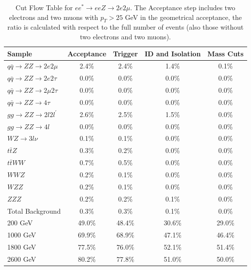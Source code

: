 \begin{table}[h]
\begin{center}
\begin{tabular}{|l|c|c|c|c|}
\hline
Sample & Acceptance & Trigger & ID and Isolation & Mass Cuts \\
\hline
\hline
$q\bar{q} \rightarrow ZZ \rightarrow 2e2\mu$ & 2.4\% & 2.4\% & 1.4\% & 0.1\% \\
$q\bar{q} \rightarrow ZZ \rightarrow 2e2\tau$ & 0.0\% & 0.0\% & 0.0\% & 0.0\% \\
$q\bar{q} \rightarrow ZZ \rightarrow 2\mu2\tau$ & 0.0\% & 0.0\% & 0.0\% & 0.0\% \\
$q\bar{q} \rightarrow ZZ \rightarrow 4\tau$ & 0.0\% & 0.0\% & 0.0\% & 0.0\% \\
$gg \rightarrow ZZ \rightarrow 2l2l^{\prime}$ & 2.6\% & 2.5\% & 1.5\% & 0.0\% \\
$gg \rightarrow ZZ \rightarrow 4l$ & 0.0\% & 0.0\% & 0.0\% & 0.0\% \\
$WZ \rightarrow 3l\nu$ & 0.1\% & 0.1\% & 0.0\% & 0.0\% \\
$t\bar{t}Z$ & 0.3\% & 0.2\% & 0.0\% & 0.0\% \\
$t\bar{t}WW$ & 0.7\% & 0.5\% & 0.0\% & 0.0\% \\
$WWZ$   & 0.2\% & 0.1\% & 0.0\% & 0.0\% \\
$WZZ$   & 0.2\% & 0.1\% & 0.0\% & 0.0\% \\
$ZZZ$   & 0.2\% & 0.2\% & 0.1\% & 0.0\% \\
\hline
\hline
Total Background & 0.3\% & 0.3\% & 0.1\% & 0.0\% \\
\hline
\hline
200 GeV & 49.0\% & 48.4\% & 30.6\% & 29.0\% \\
1000 GeV & 69.9\% & 68.9\% & 47.1\% & 46.4\% \\
1800 GeV & 77.5\% & 76.0\% & 52.1\% & 51.4\% \\
2600 GeV & 80.2\% & 77.8\% & 51.0\% & 50.0\% \\
\hline
\end{tabular}
\end{center}
\caption{\label{tab:CutFlow_2e2mu}Cut Flow Table for $ee^{*} \rightarrow ee Z \rightarrow 2e2\mu$. The Acceptance step includes two electrons and two muons with $p_{T} > 25$ GeV in the geometrical acceptance, the ratio is calculated with respect to the full number of events (also those without two electrons and two muons).}
\end{table}




